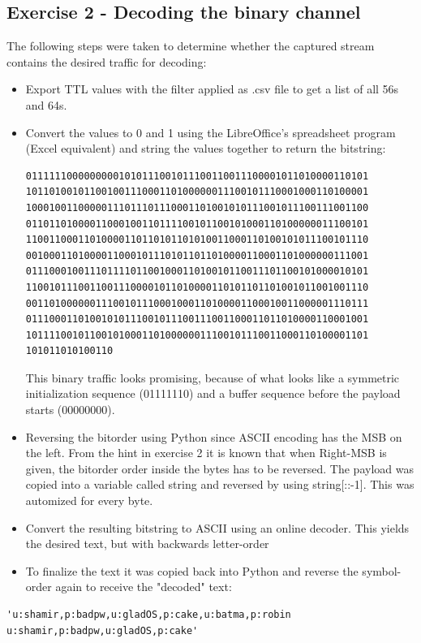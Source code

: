 \documentclass{article}
\begin{document}
\subsection*{Exercise 2 - Decoding the binary channel}
The following steps were taken to determine whether the captured stream contains the desired traffic for decoding:
\begin{itemize}
\item Export TTL values with the filter applied as .csv file to get a list of all 56s and 64s.
\item Convert the values to 0 and 1 using the LibreOffice's spreadsheet program (Excel equivalent) and string the values together to return the bitstring: 
\begin{verbatim}
01111110000000001010111001011100110011100001011010000110101
10110100101100100111000110100000011100101110001000110100001
10001001100000111011101110001101001010111001011100111001100
01101101000011000100110111100101100101000110100000011100101
11001100011010000110110101101010011000110100101011100101110
00100011010000110001011101011011010000110001101000000111001
01110001001110111101100100011010010110011101100101000010101
11001011100110011100001011010000110101101101001011001001110
00110100000011100101110001000110100001100010011000001110111
01110001101001010111001011100111001100011011010000110001001
10111100101100101000110100000011100101110011000110100001101
101011010100110
\end{verbatim}
This binary traffic looks promising, because of what looks like a symmetric initialization sequence (01111110) and a buffer sequence before the payload starts (00000000).

\item Reversing the bitorder using Python since ASCII encoding has the MSB on the left. From the hint in exercise 2 it is known that when Right-MSB is given, the bitorder order inside the bytes has to be reversed. The payload was copied into a variable called string and reversed by using string[::-1]. This was automized for every byte.
\item Convert the resulting bitstring to ASCII using an online decoder. This yields the desired text, but with backwards letter-order
\item To finalize the text it was copied back into Python and reverse the symbol-order again to receive the "decoded" text:
\end{itemize}

\begin{verbatim}
'u:shamir,p:badpw,u:gladOS,p:cake,u:batma,p:robin u:shamir,p:badpw,u:gladOS,p:cake'
\end{verbatim}
\end{document}
